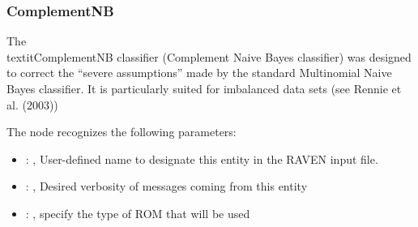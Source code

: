 \subsubsection{ComplementNB}
  The \\textit{ComplementNB} classifier (Complement Naive Bayes classifier) was designed to correct
  the ``severe assumptions'' made by the standard Multinomial Naive Bayes classifier.
  It is particularly suited for imbalanced data sets (see Rennie et al. (2003))

  The  node recognizes the following parameters:
    \begin{itemize}
      \item {}: , 
        User-defined name to designate this entity in the RAVEN input file.
      \item {}: , 
        Desired verbosity of messages coming from this entity
      \item {}: , 
        specify the type of ROM that will be used
  \end{itemize}

